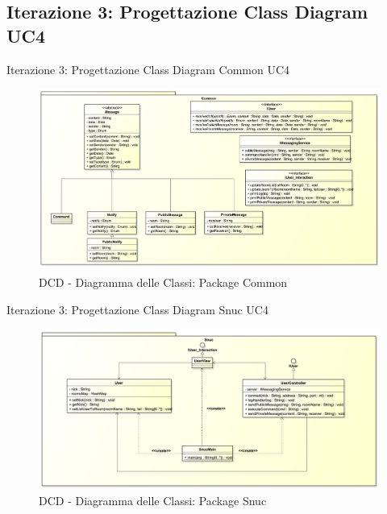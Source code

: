 \subsection{Iterazione 3: Progettazione Class Diagram UC4}
\begin{frame} {Iterazione 3: Progettazione Class Diagram Common UC4}
   \begin{figure}
     \includegraphics[scale=0.15]{image_astah/Iteration_3_DesignModel/ClassDiagramCommon.png}{\centering}
     \caption{DCD - Diagramma delle Classi: Package Common }
     \label{fig_UC4_DCD_1} 
   \end{figure}
\end{frame}

\begin{frame} {Iterazione 3: Progettazione Class Diagram Snuc UC4}
   \begin{figure}
     \includegraphics[scale=0.16]{image_astah/Iteration_3_DesignModel/ClassDiagramSnuc.png}{\centering}
     \caption{DCD - Diagramma delle Classi: Package Snuc }
     \label{fig_UC4_DCD_3} 
   \end{figure}
\end{frame}

